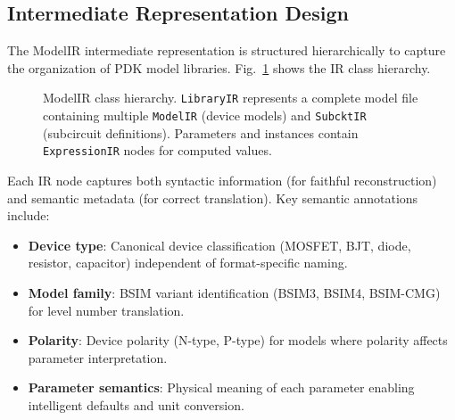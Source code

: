\documentclass[conference]{IEEEtran}
\begin{document}
\subsection{Intermediate Representation Design}

The ModelIR intermediate representation is structured hierarchically to capture the organization of PDK model libraries. Fig.~\ref{fig:ir_hierarchy} shows the IR class hierarchy.

\begin{figure}[!t]
\centering
{}
\caption{ModelIR class hierarchy. \texttt{LibraryIR} represents a complete model file containing multiple \texttt{ModelIR} (device models) and \texttt{SubcktIR} (subcircuit definitions). Parameters and instances contain \texttt{ExpressionIR} nodes for computed values.}
\label{fig:ir_hierarchy}
\end{figure}

Each IR node captures both syntactic information (for faithful reconstruction) and semantic metadata (for correct translation). Key semantic annotations include:

\begin{itemize}
    \item \textbf{Device type}: Canonical device classification (MOSFET, BJT, diode, resistor, capacitor) independent of format-specific naming.
    \item \textbf{Model family}: BSIM variant identification (BSIM3, BSIM4, BSIM-CMG) for level number translation.
    \item \textbf{Polarity}: Device polarity (N-type, P-type) for models where polarity affects parameter interpretation.
    \item \textbf{Parameter semantics}: Physical meaning of each parameter enabling intelligent defaults and unit conversion.
\end{itemize}
\end{document}
